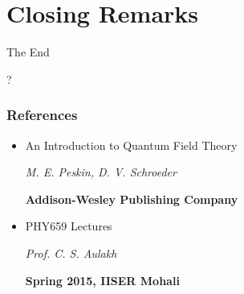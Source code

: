 \documentclass{beamer}
\begin{document}
\section{Closing Remarks}
	\begin{frame}
	\Huge{\centerline{The End}}
	\end{frame}

	\begin{frame}
	\Huge{\centerline{?}}
	\end{frame}

\begin{frame}
	\frametitle{References}
	\begin{itemize}
		\item An Introduction to Quantum Field Theory 

		\emph{M. E. Peskin, D. V. Schroeder} 

		\textbf{Addison-Wesley Publishing Company}
		\item PHY659 Lectures

		\emph{Prof. C. S. Aulakh}

		\textbf{Spring 2015, IISER Mohali}
	\end{itemize}

\end{frame}
\end{document}
